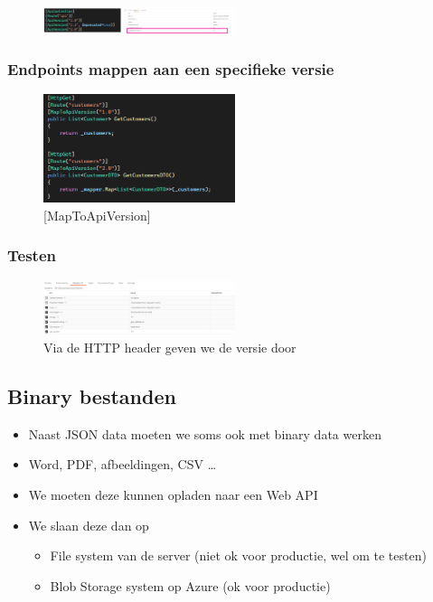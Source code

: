 \documentclass{article}
\begin{document}
\begin{figure}[H]
    \centering
    \includegraphics[width=0.5\textwidth]{versioning-deprecated.png}
    \caption{}
\end{figure}

\subsubsection{Endpoints mappen aan een specifieke versie}

\begin{figure}[H]
    \centering
    \includegraphics[width=0.5\textwidth]{versioning-maptoapiversion.png}
    \caption{[MapToApiVersion]}
\end{figure}

\subsubsection{Testen}

\begin{figure}[H]
    \centering
    \includegraphics[width=0.5\textwidth]{versioning-httpheader.png}
    \caption{Via de HTTP header geven we de versie door}
\end{figure}

\subsection{Binary bestanden}

\begin{itemize}
    \item Naast JSON data moeten we soms ook met binary data werken
    \item Word, PDF, afbeeldingen, CSV \dots
    \item We moeten deze kunnen opladen naar een Web API
    \item We slaan deze dan op
    \begin{itemize}
        \item File system van de server (niet ok voor productie, wel om te testen)
        \item Blob Storage system op Azure (ok voor productie)
    \end{itemize}
\end{itemize}
\end{document}

